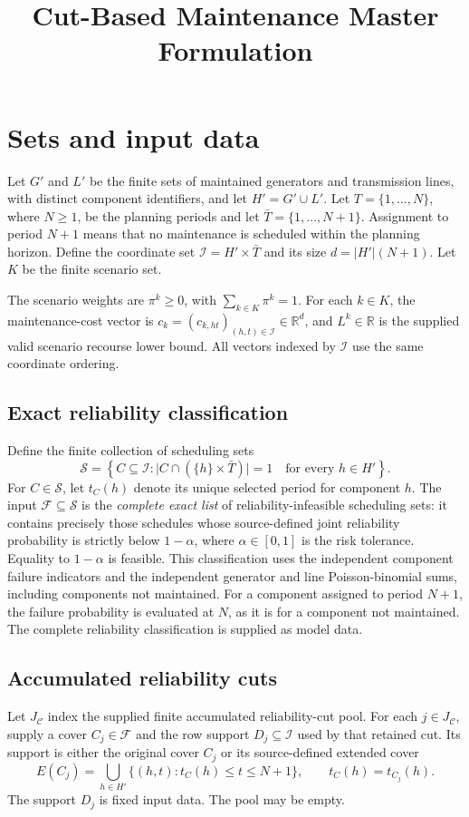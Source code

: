 \documentclass[11pt]{article}
\title{Cut-Based Maintenance Master Formulation}
\author{}
\date{}
\begin{document}
\maketitle

\section{Sets and input data}
Let $G'$ and $L'$ be the finite sets of maintained generators and transmission lines, with distinct component identifiers, and let $H'=G'\cup L'$. Let $T=\{1,\ldots,N\}$, where $N\geq 1$, be the planning periods and let $\bar T=\{1,\ldots,N+1\}$. Assignment to period $N+1$ means that no maintenance is scheduled within the planning horizon. Define the coordinate set $\mathcal I=H'\times\bar T$ and its size $d=|H'|(N+1)$. Let $K$ be the finite scenario set.

The scenario weights are $\pi^k\geq 0$, with $\sum_{k\in K}\pi^k=1$. For each $k\in K$, the maintenance-cost vector is $c_k=(c_{k,ht})_{(h,t)\in\mathcal I}\in\mathbb R^d$, and $L^k\in\mathbb R$ is the supplied valid scenario recourse lower bound. All vectors indexed by $\mathcal I$ use the same coordinate ordering.

\subsection{Exact reliability classification}
Define the finite collection of scheduling sets
\[
\mathscr S=\left\{C\subseteq\mathcal I:
  \bigl|C\cap(\{h\}\times\bar T)\bigr|=1
  \quad\text{for every }h\in H'\right\}.
\]
For $C\in\mathscr S$, let $t_C(h)$ denote its unique selected period for component $h$. The input $\mathscr F\subseteq\mathscr S$ is the \emph{complete exact list} of reliability-infeasible scheduling sets: it contains precisely those schedules whose source-defined joint reliability probability is strictly below $1-\alpha$, where $\alpha\in[0,1]$ is the risk tolerance. Equality to $1-\alpha$ is feasible. This classification uses the independent component failure indicators and the independent generator and line Poisson-binomial sums, including components not maintained. For a component assigned to period $N+1$, the failure probability is evaluated at $N$, as it is for a component not maintained. The complete reliability classification is supplied as model data.

\subsection{Accumulated reliability cuts}
Let $J_{\mathcal C}$ index the supplied finite accumulated reliability-cut pool. For each $j\in J_{\mathcal C}$, supply a cover $C_j\in\mathscr F$ and the row support $D_j\subseteq\mathcal I$ used by that retained cut. Its support is either the original cover $C_j$ or its source-defined extended cover
\[
E(C_j)=\bigcup_{h\in H'}\{(h,t):t_C(h)\leq t\leq N+1\},
\qquad t_C(h)=t_{C_j}(h).
\]
The support $D_j$ is fixed input data. The pool may be empty.
\end{document}
